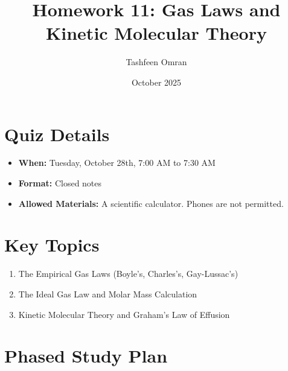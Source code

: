 \documentclass{article}
\title{Homework 11: Gas Laws and Kinetic Molecular Theory}
\author{Tashfeen Omran}
\date{October 2025}
\begin{document}
\maketitle

\section{Quiz Details}
\begin{itemize}
    \item \textbf{When:} Tuesday, October 28th, 7:00 AM to 7:30 AM
    \item \textbf{Format:} Closed notes
    \item \textbf{Allowed Materials:} A scientific calculator. Phones are not permitted.
\end{itemize}

\section{Key Topics}
\begin{enumerate}
    \item The Empirical Gas Laws (Boyle's, Charles's, Gay-Lussac's)
    \item The Ideal Gas Law and Molar Mass Calculation
    \item Kinetic Molecular Theory and Graham's Law of Effusion
\end{enumerate}

\section{Phased Study Plan}
\end{document}
